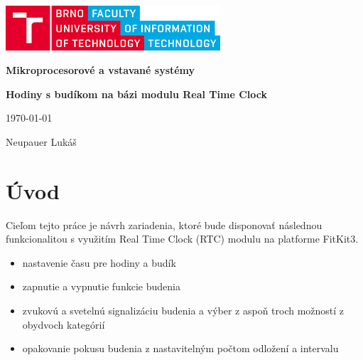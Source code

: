 \documentclass{article}
\begin{document}
\begin{titlepage}
    \begin{center}
        \vspace*{1cm}
        
        \includegraphics[width = 8cm]{images/fit.png}
        
        \vspace{2cm}
        
        \LARGE
        \textbf{Mikroprocesorové a vstavané systémy}
        
        
        \large
        
        
        \vspace{0.5cm}
        
        \large
        \textbf{Hodiny s budíkom na bázi modulu Real Time Clock}
        
        \vspace{0.5cm}
        \today
        
        \vspace{8cm}
        
    \end{center}
    Neupauer Lukáš             \hfill
    
\end{titlepage}

\newpage

\tableofcontents
\newpage

\section{Úvod}

Cieľom tejto práce je návrh zariadenia, ktoré bude disponovať následnou funkcionalitou s využitím Real Time Clock (RTC) modulu na platforme FitKit3.
\begin{itemize}
    \item nastavenie času pre hodiny a budík
    \item zapnutie a vypnutie funkcie budenia
    \item zvukovú a svetelnú signalizáciu budenia a výber z aspoň troch možností z obydvoch kategórií
    \item opakovanie pokusu budenia z nastavitelným počtom odložení a intervalu
\end{itemize}
\end{document}
